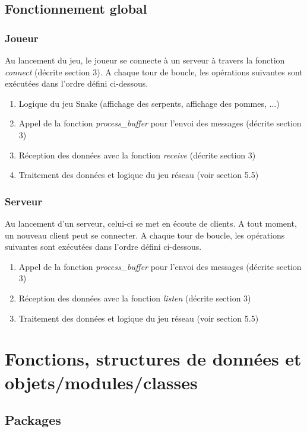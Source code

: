 \documentclass[a4paper]{article}
\begin{document}
\subsection{Fonctionnement global}
\subsubsection{Joueur}
Au lancement du jeu, le joueur se connecte à un serveur à travers la fonction \textit{connect} (décrite section 3).
A chaque tour de boucle, les opérations suivantes sont exécutées dans l'ordre défini ci-dessous.
\begin{enumerate}
\item Logique du jeu Snake (affichage des serpents, affichage des pommes, ...)
\item Appel de la fonction \textit{process\_buffer} pour l'envoi des messages (décrite section 3)
\item Réception des données avec la fonction \textit{receive} (décrite section 3)
\item Traitement des données et logique du jeu réseau (voir section 5.5)
\end{enumerate}
\subsubsection{Serveur}
Au lancement d'un serveur, celui-ci se met en écoute de clients. A tout moment, un nouveau client peut se connecter.
A chaque tour de boucle, les opérations suivantes sont exécutées dans l'ordre défini ci-dessous.
\begin{enumerate}
\item Appel de la fonction \textit{process\_buffer} pour l'envoi des messages (décrite section 3)
\item Réception des données avec la fonction \textit{listen} (décrite section 3)
\item Traitement des données et logique du jeu réseau (voir section 5.5)
\end{enumerate}

\section{Fonctions, structures de données et objets/modules/classes}

\subsection{Packages}
\end{document}
